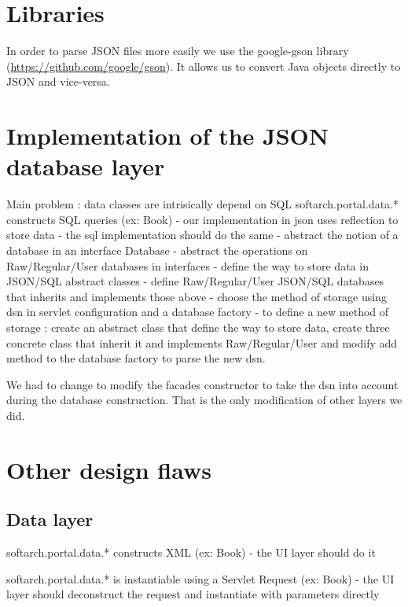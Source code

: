 \section{Libraries}

In order to parse JSON files more easily we use the google-gson library (\href{https://github.com/google/gson}{https://github.com/google/gson}). It allows us to convert Java objects directly to JSON and vice-versa.

\section{Implementation of the JSON database layer}

Main problem : data classes are intrisically depend on SQL softarch.portal.data.* constructs SQL queries (ex: Book) - our implementation in json uses reflection to store data - the sql implementation should do the same - abstract the notion of a database in an interface Database - abstract the operations on Raw/Regular/User databases in interfaces - define the way to store data in JSON/SQL abstract classes - define Raw/Regular/User JSON/SQL databases that inherits and implements those above - choose the method of storage using dsn in servlet configuration and a database factory - to define a new method of storage : create an abstract class that define the way to store data, create three concrete class that inherit it and implements Raw/Regular/User and modify add method to the database factory to parse the new dsn.

We had to change to modify the facades constructor to take the dsn into account during the database construction. That is the only modification of other layers we did.

\section{Other design flaws}

\subsection{Data layer}

softarch.portal.data.* constructs XML (ex: Book) - the UI layer should do it

softarch.portal.data.* is instantiable using a Servlet Request (ex: Book) - the UI layer should deconstruct the request and instantiate with parameters directly

